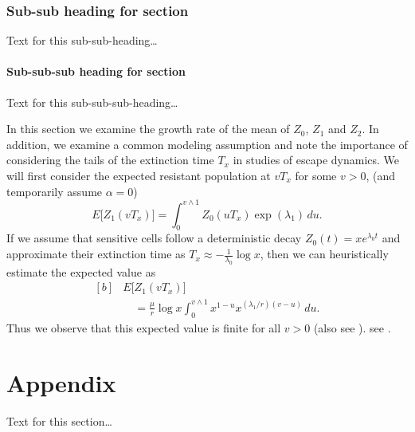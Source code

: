 \documentclass[twocolumn]{bmcart}%
\begin{document}
\subsubsection*{Sub-sub heading for section}
Text for this sub-sub-heading\ldots
\paragraph*{Sub-sub-sub heading for section}
Text for this sub-sub-sub-heading\ldots

In this section we examine the growth rate of the mean of $Z_0$, $Z_1$ and $Z_2$. In
addition, we examine a common modeling assumption and note the
importance of considering the tails of the extinction time $T_x$ in
studies of escape dynamics.
We will first consider the expected resistant population at $vT_x$ for
some $v>0$, (and temporarily assume $\alpha=0$)
%
\[
  E \bigl[Z_1(vT_x) \bigr]=
  \int_0^{v\wedge
    1}Z_0(uT_x)
  \exp (\lambda_1)\,du .
\]
%
If we assume that sensitive cells follow a deterministic decay
$Z_0(t)=xe^{\lambda_0 t}$ and approximate their extinction time as
$T_x\approx-\frac{1}{\lambda_0}\log x$, then we can heuristically
estimate the expected value as
%
\begin{equation}\label{eqexpmuts}
  \begin{aligned}[b]
     & E\bigl[Z_1(vT_x)\bigr]           \\
     & \quad      = \frac{\mu}{r}\log x
    \int_0^{v\wedge1}x^{1-u}x^{({\lambda_1}/{r})(v-u)}\,du .
  \end{aligned}
\end{equation}
%
Thus we observe that this expected value is finite for all $v>0$ (also see \cite{koon,xjon,marg,schn,koha,issnic}).
see \cite{DBLP:journals/corr/Toghiani-RiziW17}.

\section*{Appendix}
Text for this section\ldots

\end{document}
